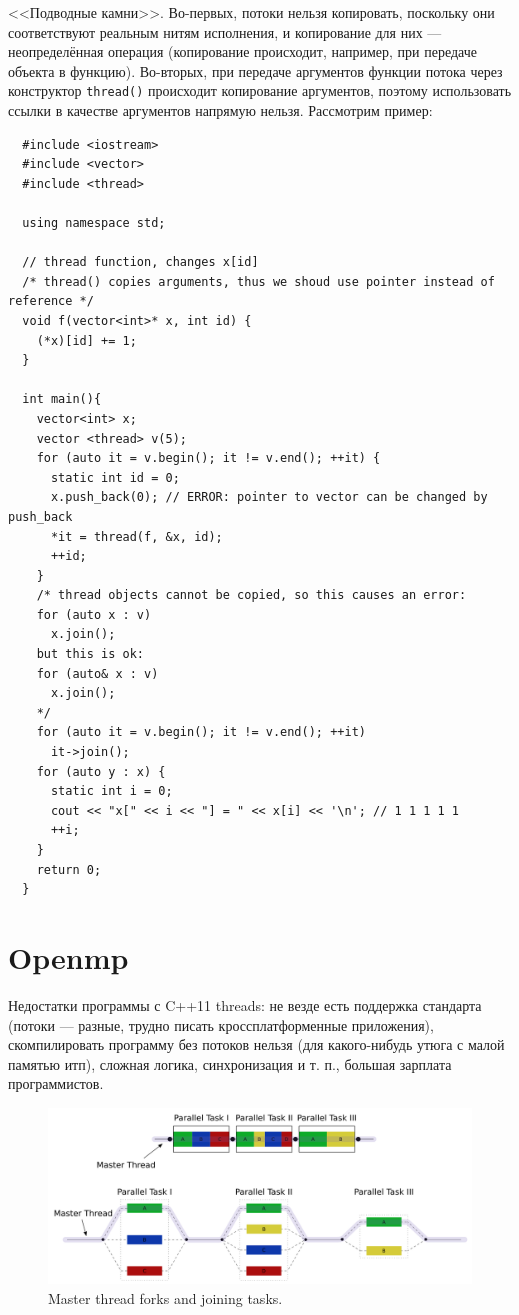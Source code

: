 \documentclass{book}
\begin{document}
<<Подводные камни>>. Во-первых, потоки нельзя копировать, поскольку они
соответствуют реальным нитям исполнения, и копирование для них ---
неопределённая операция (копирование происходит, например, при передаче объекта
в функцию). Во-вторых, при передаче аргументов функции потока через конструктор
\texttt{thread()} происходит копирование аргументов, поэтому
использовать ссылки в качестве аргументов напрямую нельзя. Рассмотрим пример:
\begin{verbatim}
  #include <iostream>
  #include <vector>
  #include <thread>

  using namespace std;

  // thread function, changes x[id]
  /* thread() copies arguments, thus we shoud use pointer instead of reference */
  void f(vector<int>* x, int id) {
    (*x)[id] += 1;
  }

  int main(){
    vector<int> x;
    vector <thread> v(5);
    for (auto it = v.begin(); it != v.end(); ++it) {
      static int id = 0;
      x.push_back(0); // ERROR: pointer to vector can be changed by push_back
      *it = thread(f, &x, id);
      ++id;
    }
    /* thread objects cannot be copied, so this causes an error:
    for (auto x : v)
      x.join();
    but this is ok:
    for (auto& x : v)
      x.join();
    */
    for (auto it = v.begin(); it != v.end(); ++it)
      it->join();
    for (auto y : x) {
      static int i = 0;
      cout << "x[" << i << "] = " << x[i] << '\n'; // 1 1 1 1 1
      ++i;
    }
    return 0;
  }
\end{verbatim}

\section{Openmp}

Недостатки программы с C++11 threads: не везде есть поддержка стандарта (потоки --- разные, трудно
писать кроссплатформенные приложения), скомпилировать программу без потоков нельзя (для
какого-нибудь утюга с малой памятью итп), сложная логика, синхронизация и т. п., большая зарплата
программистов.

\begin{figure}
  \centering
  \includegraphics[width=12cm]{Fork_join_omp_wiki.png}
  \caption{\label{fig:mathgl_stereo}Master thread forks and joining tasks.}
\end{figure}
\end{document}
